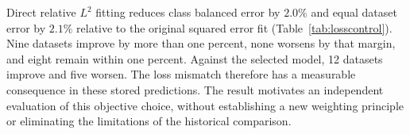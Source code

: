 \begin{table}[t]
\centering\small
\caption{\textbf{Fitting the reported metric directly.} Ratios compare with the
selected model on the original 17 PDE dataset diagnostic subset at five fitting examples.
The fitted mixture uses squared relative error. A win or loss requires
more than a one percent difference after averaging the three partitions for
each dataset. Remaining datasets are within one percent. These are post hoc
results on a fixed library, without independent training replicates.}
\label{tab:losscontrol}

\end{table}

Direct relative $L^2$ fitting reduces class balanced error by $2.0\%$ and equal
dataset error by $2.1\%$ relative to the original squared error fit
(Table~\ref{tab:losscontrol}). Nine datasets improve by more than one percent,
none worsens by that margin, and eight remain within one percent. Against the
selected model, 12 datasets improve and five worsen. The loss mismatch therefore
has a measurable consequence in these stored predictions. The result motivates
an independent evaluation of this objective choice, without establishing a new
weighting principle or eliminating the limitations of the historical comparison.
